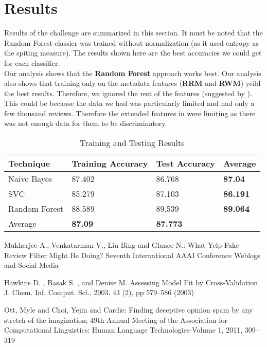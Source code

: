 \documentclass{llncs}
\begin{document}
\section{Results}
Results of the challenge are summarized in this section. It must be noted that the Random Forest classier was trained without normalization (as it used entropy as the spiting measure).
The results shown here are the best accuracies we could get for each classifier. \\
Our analysis shows that the \textbf{Random Forest} approach works best. Our analysis also shows that training only on the metadata features (\textbf{RRM} and \textbf{RWM}) yeild the best results. Therefore, we ignored the rest of the features (suggested by \cite{arjun:et}). This could be because the data we had was particularly limited and had only a few thousand reviews. Therefore the extended features in \cite{arjun:et} were limiting as there was not enough data for them to be discriminatory.

\begin{table}[h]
\centering
  \caption{Training and Testing Results }
\begin{tabular}{ |p{3cm}||p{3cm}|p{3cm}|p{3cm}| }
 \hline
 Technique&Training Accuracy    &Test Accuracy &Average\\
 \hline
 Naive Bayes                &87.402    &86.768 &\textbf{87.04}\\
 SVC                        &85.279    &87.103
  &\textbf{86.191}\\
 Random Forest              &88.589    &89.539 &\textbf{89.064}\\
 \hline
 Average     &\textbf{87.09}&\textbf{87.773} &\textbf{}\\
  \hline
\end{tabular}
\label{table}
\end{table}



%
%
\begin{thebibliography}{5}
%
Mukherjee A., Venkatarman V., Liu Bing and Glance N.:
What Yelp Fake Review Filter Might Be Doing?
Seventh International AAAI Conference Weblogs and Social Media

Hawkins D. , Basak S. , and Denise M. 
Assessing Model Fit by Cross-Validation
J. Chem. Inf. Comput. Sci., 2003, 43 (2), pp 579–586 (2003)

Ott, Myle and Choi, Yejin and Cardie:
Finding deceptive opinion spam by any stretch of the imagination; 49th Annual Meeting of the Association for Computational Linguistics: Human Language Technologies-Volume 1, 2011, 309--319

\end{thebibliography}
\end{document}
